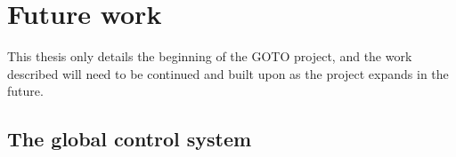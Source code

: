 
\section{Future work}
\label{sec:future}


\begin{colsection}

This thesis only details the beginning of the GOTO project, and the work described will need to be continued and built upon as the project expands in the future.

\end{colsection}


\subsection{The global control system}
\label{sec:gtecs_future}
